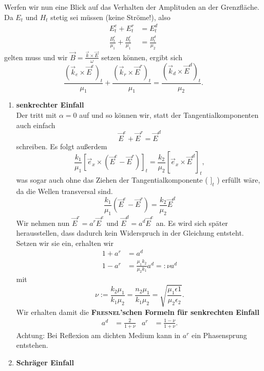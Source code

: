 Werfen wir nun eine Blick auf das Verhalten der Amplituden an der Grenzfläche. Da $E_t$ und $H_t$ stetig sei müssen (keine Ströme!), also
\begin{align*}
E_t^e+E_t^r &= E_t^d\\
\frac{B_t^e}{\mu_1}+\frac{B_t^r}{\mu_1} &= \frac{B_t^d}{\mu_2}
\end{align*}
gelten muss und wir $\vec{B}=\frac{\vec{k}\times\vec{E}}{\omega}$ setzen können, ergibt sich
\begin{equation*}
\frac{(\vec{k}_e\times\vec{E}^e)_t}{\mu_1}+\frac{(\vec{k}_r\times\vec{E}^r)_t}{\mu_1} = \frac{(\vec{k}_d\times\vec{E}^d)_t}{\mu_2}.
\end{equation*}

\begin{enumerate}
\item \textbf{ senkrechter Einfall}\\

Der tritt mit $\alpha=0$ auf und so können wir, statt der Tangentialkomponenten auch einfach
\begin{equation*}
\vec{E}^e + \vec{E}^r = \vec{E}^d
\end{equation*}
schreiben. Es folgt außerdem
\begin{equation*}
\frac{k_1}{\mu_1}\left[\vec{e}_x\times\left(\vec{E}^e-\vec{E}^r\right)\right]_t = \frac{k_2}{\mu_2}\left[\vec{e}_x\times\vec{E}^d\right]_t,
\end{equation*}
was sogar auch ohne das Ziehen der Tangentialkomponente ( $]_t$ ) erfüllt wäre, da die Wellen transversal sind. 
\begin{equation*}
\frac{k_1}{\mu_1}\left(\vec{E}^e-\vec{E}^r\right) = \frac{k_2}{\mu_2}\vec{E}^d
\end{equation*}
Wir nehmen nun $\vec{E}^r=a^r\vec{E}^e$ und $\vec{E}^d=a^d\vec{E}^e$ an. Es wird sich später herausstellen, dass dadurch kein Widerspruch in der Gleichung entsteht. Setzen wir sie ein, erhalten wir
\begin{align*}
1+a^r&=a^d\\
1-a^r&=\frac{\mu_1k_2}{\mu_2k_1}a^d=:\nu a^d
\end{align*}
mit
\begin{equation*}
\nu:=\frac{k_2\mu_1}{k_1\mu_2}=\frac{n_2\mu_1}{k_1\mu_2}=\sqrt{\frac{\mu_1\epsilon1}{\mu_2\epsilon_2}}.
\end{equation*}
Wir erhalten damit die \textbf{\textsc{Fresnel}'schen Formeln für senkrechten Einfall}
\begin{align*}
a^d&=\frac{2}{1+\nu} & a^r &=\frac{1-\nu}{1+\nu}.
\end{align*}
Achtung: Bei Reflexion am dichten Medium kann in $a^r$ ein Phasensprung entstehen.\\
\newpage
\item \textbf{ Schräger Einfall}\\


\end{enumerate}
